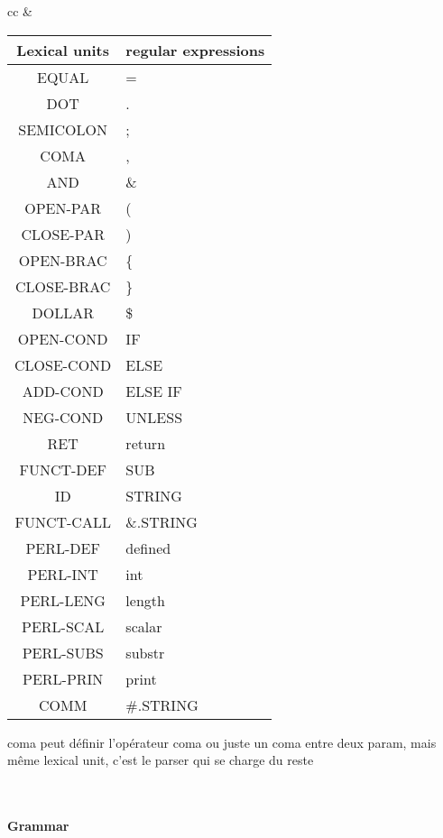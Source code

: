 \documentclass[a4paper,10pt]{article}
\begin{document}
\begin{tabular}{cc}
&

\begin{tabular}{|c|l|}
\hline
Lexical units  		& regular expressions \\ \hline
EQUAL				& = \\ \hline
DOT					& . \\ \hline
SEMICOLON			& ; \\ \hline
COMA				& , \\ \hline
AND					& \& \\ \hline
OPEN-PAR			& ( \\ \hline
CLOSE-PAR			& ) \\ \hline
OPEN-BRAC			& \{ \\ \hline
CLOSE-BRAC			& \} \\ \hline
DOLLAR				& \$ \\ \hline
OPEN-COND			& IF \\ \hline
CLOSE-COND 			& ELSE \\ \hline
ADD-COND			& ELSE IF \\ \hline
NEG-COND			& UNLESS \\ \hline
RET					& return \\ \hline
FUNCT-DEF			& SUB \\ \hline
ID					& STRING \\ \hline 
FUNCT-CALL			& \&.STRING \\ \hline
PERL-DEF			& defined  \\ \hline
PERL-INT			& int  \\ \hline
PERL-LENG			& length  \\ \hline
PERL-SCAL			& scalar  \\ \hline
PERL-SUBS			& substr  \\ \hline
PERL-PRIN			& print\\ \hline
COMM				& \#.STRING \\ \hline
					


\end{tabular}
\end{tabular}
coma peut définir l'opérateur coma ou juste un coma entre deux param, mais même lexical unit, c'est le parser qui se charge du reste


\pagebreak
~\\
\paragraph{Grammar}
\end{document}
